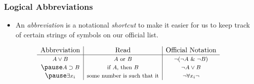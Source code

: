 \begin{frame}
\frametitle{Logical Abbreviations}

\begin{itemize}[<+->]

\item An \emph{abbreviation} is a notational \textit{shortcut} to make it easier for us to keep track of certain strings of symbols on our official list. 
\end{itemize}
 \pause 
\[
\begin{array}{c|c|c}
 \text{{Abbreviation}}  &\text{{Read}} &\text{{Official Notation}}   \\
\hline
\text{\footnotesize $A \vee B$}  & \text{\footnotesize  $A$ or $B$}  & \text{\footnotesize  $\neg(\neg A  \ \& \ \neg B)$} \\ \pause 
\text{\footnotesize $A \supset B$}  & \text{\footnotesize  if $A$, then $B$}  & \text{\footnotesize  $\neg A  \vee B$} \\ \pause 
\text{\footnotesize $\exists x_i$}  & \text{\footnotesize  some number is such that it}  & \text{\footnotesize  $\neg \forall x_i \neg$} \\ 
\end{array}
\]


\end{frame}

